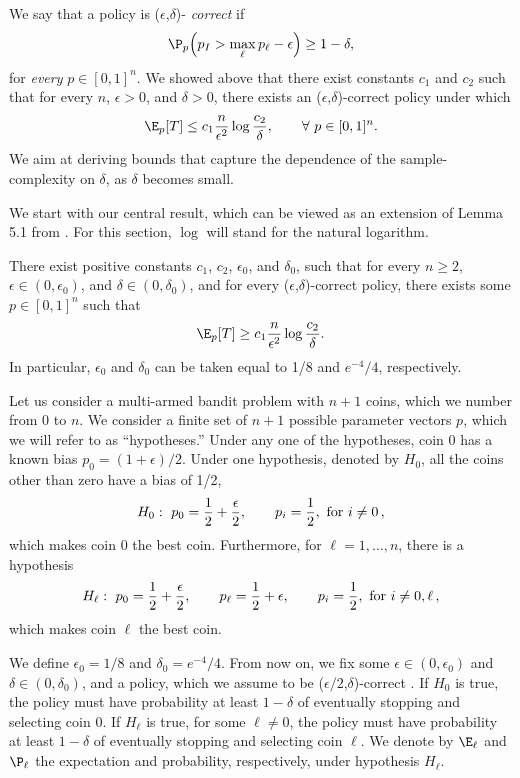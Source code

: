 We say that a policy is ($\epsilon$,$\delta$)-{\it
correct} if
$$\P_p\Big(p_I> \max_\ell p_\ell-\epsilon\Big)\geq 1-\delta,$$
for {\it every} $p\in[0,1]^n$. We showed above that
there exist constants $c_1$ and $c_2$ such that for every $n$,
$\epsilon>0$, and $\delta>0$, there exists an ($\epsilon$,$\delta$)-correct policy
under which
$$\E_p[T]\leq c_1\frac{n}{\epsilon^2}\log \frac{c_2}{\delta},
\qquad \forall\ p\in [0,1]^n.$$
We aim at
deriving bounds that capture the dependence of the
sample-complexity on $\delta$, as $\delta$ becomes small.



We start with our central result, which can be viewed as an extension
of Lemma 5.1 from \cite{anthony_bartlett99}.
For this section,  $\log$ will stand for the natural
logarithm.
\begin{theorem} \label{th:main}
There exist positive constants $c_1$, $c_2$, $\epsilon_0$, and
$\delta_0$, such that for every $n\geq 2$,
$\epsilon\in(0,\epsilon_0)$, and $\delta\in(0,\delta_0)$, and for
every ($\epsilon$,$\delta$)-correct policy, there exists
some $p\in[0,1]^n$ such that
$$\E_p[T]\geq c_1\frac{n}{\epsilon^2}\log \frac{c_2}{\delta}.$$
In particular, $\epsilon_0$ and $\delta_0$ can be taken equal to
1/8  and $e^{-4}/4$, respectively.
\end{theorem}
\proof Let us consider a multi-armed bandit problem with $n+1$
coins, which we number from 0 to $n$. We consider a finite set of
$n+1$ possible parameter vectors $p$, which we will refer to as
``hypotheses.'' Under any one of the hypotheses, coin 0 has a
known bias $p_0=(1+\epsilon)/2$. Under one hypothesis, denoted by
$H_0$, all the coins other than zero have a bias of 1/2,
$$
H_0:\ p_0=\frac{1}{2}+\frac{\epsilon}{2},\qquad p_i=\frac{1}{2}, \
{\rm for}\ i\neq 0\,,$$ which makes coin 0 the best coin.
Furthermore, for $\ell=1,\ldots,n$, there is a hypothesis
$$
H_\ell:\ p_0=\frac{1}{2}+\frac{\epsilon}{2},\qquad
p_\ell=\frac{1}{2}+\epsilon, \qquad p_i=\frac{1}{2},\ {\rm for}\
i\neq 0,\ell\,,$$ which makes coin $\ell$ the best coin.


We define $\epsilon_0=1/8$ and $\delta_0=e^{-4}/4$.
From now on, we fix
some $\epsilon\in(0,\epsilon_0)$ and $\delta\in(0,\delta_0)$, and a policy,
which we assume to be
($\epsilon/2$,$\delta$)-correct . If $H_0$ is true, the policy must
have probability at least $1-\delta$ of eventually stopping and
selecting coin 0. If $H_\ell$ is true, for some $\ell\neq 0$, the policy
must have probability at least $1-\delta$ of eventually stopping
and selecting coin $\ell$. We denote by $\E_\ell$ and $\P_\ell$ the
expectation and probability, respectively, under hypothesis $H_\ell$.

